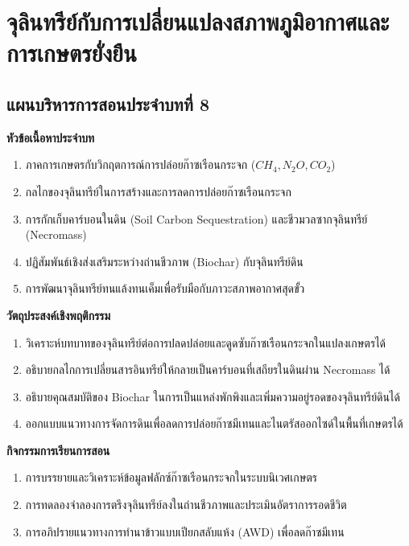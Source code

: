 \chapter{จุลินทรีย์กับการเปลี่ยนแปลงสภาพภูมิอากาศและการเกษตรยั่งยืน}
\label{chap:ch08}

\section*{แผนบริหารการสอนประจำบทที่ 8}

\noindent\textbf{หัวข้อเนื้อหาประจำบท}
\begin{enumerate}
    \item ภาคการเกษตรกับวิกฤตการณ์การปล่อยก๊าซเรือนกระจก ($CH_4, N_2O, CO_2$)
    \item กลไกของจุลินทรีย์ในการสร้างและการลดการปล่อยก๊าซเรือนกระจก
    \item การกักเก็บคาร์บอนในดิน (Soil Carbon Sequestration) และชีวมวลซากจุลินทรีย์ (Necromass)
    \item ปฏิสัมพันธ์เชิงส่งเสริมระหว่างถ่านชีวภาพ (Biochar) กับจุลินทรีย์ดิน
    \item การพัฒนาจุลินทรีย์ทนแล้งทนเค็มเพื่อรับมือกับภาวะสภาพอากาศสุดขั้ว
\end{enumerate}

\noindent\textbf{วัตถุประสงค์เชิงพฤติกรรม}
\begin{enumerate}
    \item วิเคราะห์บทบาทของจุลินทรีย์ต่อการปลดปล่อยและดูดซับก๊าซเรือนกระจกในแปลงเกษตรได้
    \item อธิบายกลไกการเปลี่ยนสารอินทรีย์ให้กลายเป็นคาร์บอนที่เสถียรในดินผ่าน Necromass ได้
    \item อธิบายคุณสมบัติของ Biochar ในการเป็นแหล่งพักพิงและเพิ่มความอยู่รอดของจุลินทรีย์ดินได้
    \item ออกแบบแนวทางการจัดการดินเพื่อลดการปล่อยก๊าซมีเทนและไนตรัสออกไซด์ในพื้นที่เกษตรได้
\end{enumerate}

\noindent\textbf{กิจกรรมการเรียนการสอน}
\begin{enumerate}
    \item การบรรยายและวิเคราะห์ข้อมูลฟลักซ์ก๊าซเรือนกระจกในระบบนิเวศเกษตร
    \item การทดลองจำลองการตรึงจุลินทรีย์ลงในถ่านชีวภาพและประเมินอัตราการรอดชีวิต
    \item การอภิปรายแนวทางการทำนาข้าวแบบเปียกสลับแห้ง (AWD) เพื่อลดก๊าซมีเทน
\end{enumerate}

